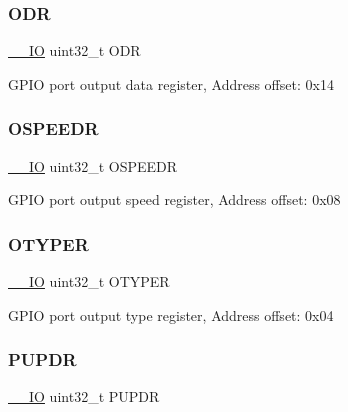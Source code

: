 \subsubsection{\texorpdfstring{O\+DR}{ODR}}
{\footnotesize\ttfamily \hyperlink{core__sc300_8h_aec43007d9998a0a0e01faede4133d6be}{\+\_\+\+\_\+\+IO} uint32\+\_\+t O\+DR}

G\+P\+IO port output data register, Address offset\+: 0x14 \mbox{\label{struct_g_p_i_o___type_def_a328d16cc6213783ede54e4059ffd50a3}} 
\subsubsection{\texorpdfstring{O\+S\+P\+E\+E\+DR}{OSPEEDR}}
{\footnotesize\ttfamily \hyperlink{core__sc300_8h_aec43007d9998a0a0e01faede4133d6be}{\+\_\+\+\_\+\+IO} uint32\+\_\+t O\+S\+P\+E\+E\+DR}

G\+P\+IO port output speed register, Address offset\+: 0x08 \mbox{\label{struct_g_p_i_o___type_def_a9543592bda60cb5261075594bdeedac9}} 
\subsubsection{\texorpdfstring{O\+T\+Y\+P\+ER}{OTYPER}}
{\footnotesize\ttfamily \hyperlink{core__sc300_8h_aec43007d9998a0a0e01faede4133d6be}{\+\_\+\+\_\+\+IO} uint32\+\_\+t O\+T\+Y\+P\+ER}

G\+P\+IO port output type register, Address offset\+: 0x04 \mbox{\label{struct_g_p_i_o___type_def_abeed38529bd7b8de082e490e5d4f1727}} 
\subsubsection{\texorpdfstring{P\+U\+P\+DR}{PUPDR}}
{\footnotesize\ttfamily \hyperlink{core__sc300_8h_aec43007d9998a0a0e01faede4133d6be}{\+\_\+\+\_\+\+IO} uint32\+\_\+t P\+U\+P\+DR}

